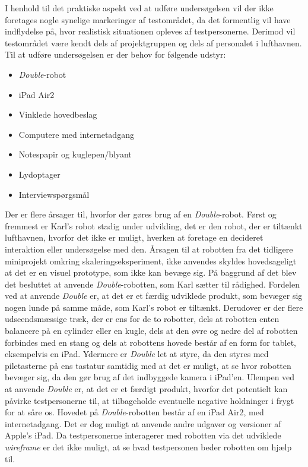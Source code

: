 I henhold til det praktiske aspekt ved at udføre undersøgelsen vil der ikke foretages nogle synelige markeringer af testområdet, da det formentlig vil have indflydelse på, hvor realistisk situationen opleves af testpersonerne. Derimod vil testområdet være kendt dels af projektgruppen og dels af personalet i lufthavnen. \blankline
%
Til at udføre undersøgelsen er der behov for følgende udstyr:\blankline
%
\begin{itemize}
  \item \textit{Double}-robot
  \item iPad Air2
  \item Vinklede hovedbeslag
  \item Computere med internetadgang
  \item Notespapir og kuglepen/blyant
  \item Lydoptager
  \item Interviewspørgsmål\blankline
\end{itemize}
\noindent
%
Der er flere årsager til, hvorfor der gøres brug af en \textit{Double}-robot. Først og fremmest er Karl's robot stadig under udvikling, det er den robot, der er tiltænkt lufthavnen, hvorfor det ikke er muligt, hverken at foretage en decideret interaktion eller undersøgelse med den. Årsagen til at robotten fra det tidligere miniprojekt omkring skaleringseksperiment, ikke anvendes skyldes hovedsageligt at det er en visuel prototype, som ikke kan bevæge sig. På baggrund af det blev det besluttet at anvende \textit{Double}-robotten, som Karl sætter til rådighed. Fordelen ved at anvende \textit{Double} er, at det er et færdig udviklede produkt, som bevæger sig nogen lunde på samme måde, som Karl's robot er tiltænkt. Derudover er der flere udseendsmæssige træk, der er ens for de to robotter, dels at robotten enten balancere på en cylinder eller en kugle, dels at den øvre og nedre del af robotten forbindes med en stang og dels at robottens hovede består af en form for tablet, eksempelvis en iPad. Ydermere er \textit{Double} let at styre, da den styres med piletasterne på ens tastatur samtidig med at det er muligt, at se hvor robotten bevæger sig, da den gør brug af det indbyggede kamera i iPad'en. Ulempen ved at anvende \textit{Double} er, at det er et færdigt produkt, hvorfor det potentielt kan påvirke testpersonerne til, at tilbageholde eventuelle negative holdninger i frygt for at såre os. 
%
Hovedet på \textit{Double}-robotten består af en iPad Air2, med internetadgang. Det er dog muligt at anvende andre udgaver og versioner af Apple's iPad. Da testpersonerne interagerer med robotten via det udviklede \textit{wireframe} er det ikke muligt, at se hvad testpersonen beder robotten om hjælp til. 

